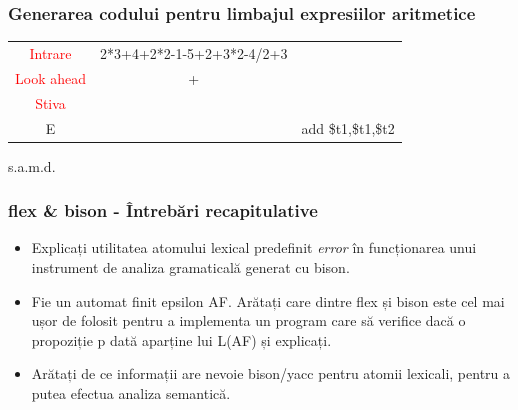 \documentclass[pdf]{beamer}
\begin{document}
\begin{frame}
\frametitle{Generarea codului pentru limbajul expresiilor aritmetice}
\begin{center}
\begin{tabular}{cc|c|} \cline{1-2}
\multicolumn{1}{|c|}{\textcolor{red}{Intrare}} & {2*3+4+2*2-1-5+2+3*2-4/2+3} \\ \cline{1-2}
\multicolumn{1}{|c|}{\textcolor{red}{Look ahead}} & + \\ \cline{1-2}
\multicolumn{1}{|c|}{\textcolor{red}{Stiva}}  \\
\cline{1-1} \cline{3-3}
\multicolumn{1}{|c|}{E} & & {add \quad \$t1,\$t1,\$t2}\\
\cline{1-1} \cline{3-3}
\end{tabular}
\end{center}

\vspace{8mm} \hspace{80mm} s.a.m.d.
\end{frame}



\begin{frame}
\frametitle{flex \& bison - Întrebări recapitulative}
\begin{itemize}
\item
Explicați utilitatea atomului lexical predefinit \textit{error} în funcționarea unui instrument de analiza gramaticală generat cu bison.
\newline

\item
Fie un automat finit epsilon AF. Arătați care dintre flex și bison este cel mai ușor de folosit pentru a implementa un program care să verifice dacă o propoziție p dată aparține lui L(AF) și explicați.
\newline

\item
Arătați de ce informații are nevoie bison/yacc pentru atomii lexicali, pentru a putea efectua analiza semantică.
\end{itemize}
\end{frame}
\end{document}
